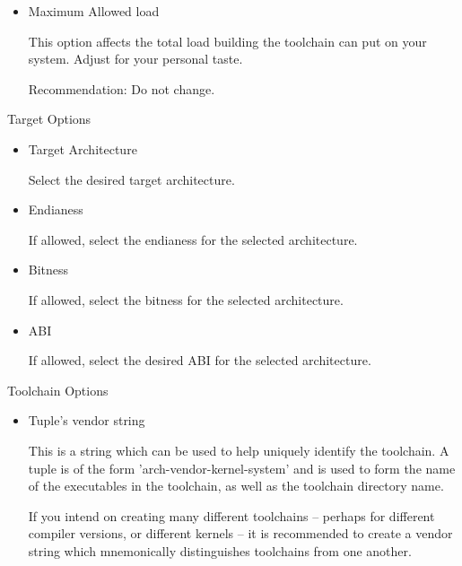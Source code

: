 \begin{description}
\begin{description}
\begin{itemize}
        This option affects the number of parallel jobs used when
        building the toolchain.  The system will automatically
        determine a reasonable number, but you can change it.


        Recommendation: Do not change.

      \item{Maximum Allowed load}

        This option affects the total load building the toolchain can put on
        your system.  Adjust for your personal taste.

        Recommendation: Do not change.

      \end{itemize}

    \item{Target Options}
      \begin{itemize}
      \item{Target Architecture}

        Select the desired target architecture.

      \item{Endianess}

        If allowed, select the endianess for the selected architecture.

      \item{Bitness}

        If allowed, select the bitness for the selected architecture.

      \item{ABI}

        If allowed, select the desired ABI for the selected architecture.

      \end{itemize}

    \item{Toolchain Options}

      \begin{itemize}
      \item{Tuple's vendor string}

        This is a string which can be used to help uniquely identify
        the toolchain.  A tuple is of the form
        'arch-vendor-kernel-system' and is used to form the name of
        the executables in the toolchain, as well as the toolchain
        directory name.

        If you intend on creating many different toolchains -- perhaps
        for different compiler versions, or different kernels -- it is
        recommended to create a vendor string which mnemonically
        distinguishes toolchains from one another.


\end{itemize}
\end{description}
\end{description}
